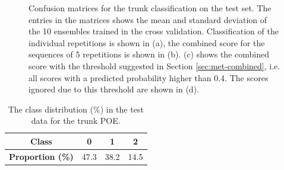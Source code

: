 \begin{figure}[h]
\begin{subfigure}[t]{0.48\textwidth}
      \caption{}
      \label{fig:trunk-cnf-ignored}
  \end{subfigure}
  \caption{Confusion matrices for the trunk classification on the test set. The entries in the matrices shows the mean and standard deviation of the 10 ensembles trained in the cross validation. Classification of the individual repetitions is shown in (a), the combined score for the sequences of 5 repetitions is shown in (b). (c) shows the combined score with the threshold suggested in Section \ref{sec:met-combined}, i.e. all scores with a predicted probability higher than 0.4. The scores ignored due to this threshold are shown in (d).}
  \label{fig:trunk-cnfs}
\end{figure}

\begin{table}[h]
  \caption{The class distribution (\%) in the test data for the trunk POE.}
  \label{tab:trunk-class-dist}
  \centering
  \begin{tabu}[c]{cccc}
    \textbf{Class}            & 0 & 1 & 2 \\ \hline \hline
    \textbf{Proportion (\%)}  & 47.3 & 38.2 & 14.5
  \end{tabu}
\end{table}


